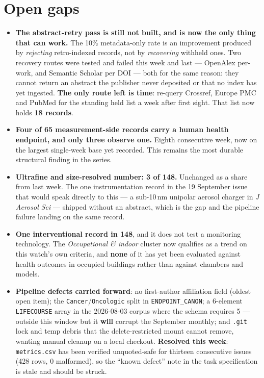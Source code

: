 \documentclass[10pt]{article}
\begin{document}
\vspace{2mm}
\section*{\sffamily\bfseries\color{Deep}Open gaps}
\vspace{-1.5mm}{\color{Teal}\rule{\linewidth}{1.1pt}}\vspace{2.5mm}

\footnotesize
\begin{itemize}
\item \textbf{The abstract-retry pass is still not built, and is now the only thing that
can work.} The 10\% metadata-only rate is an improvement produced by \emph{rejecting}
retro-indexed records, not by \emph{recovering} withheld ones. Two recovery routes were
tested and failed this week and last --- OpenAlex per-work, and Semantic Scholar per DOI
--- both for the same reason: they cannot return an abstract the publisher never deposited
or that no index has yet ingested. \textbf{The only route left is time}: re-query Crossref,
Europe PMC and PubMed for the standing held list a week after first sight. That list now
holds \textbf{18 records}.

\item \textbf{Four of 65 measurement-side records carry a human health endpoint, and only
three observe one.} Eighth consecutive week, now on the largest single-week base yet
recorded. This remains the most durable structural finding in the series.

\item \textbf{Ultrafine and size-resolved number: 3 of 148.} Unchanged as a share from
last week. The one instrumentation record in the 19 September issue that would speak
directly to this --- a sub-10\,nm unipolar aerosol charger in \textit{J Aerosol Sci} ---
shipped without an abstract, which is the gap and the pipeline failure landing on the
same record.

\item \textbf{One interventional record in 148}, and it does not test a monitoring
technology. The \textit{Occupational \& indoor} cluster now qualifies as a trend on this
watch's own criteria, and \textbf{none} of it has yet been evaluated against health
outcomes in occupied buildings rather than against chambers and models.

\item \textbf{Pipeline defects carried forward}: no first-author affiliation field (oldest
open item); the \texttt{Cancer}/\texttt{Oncologic} split in \texttt{ENDPOINT\_CANON}; a
6-element \texttt{LIFECOURSE} array in the 2026-08-03 corpus where the schema requires 5
--- outside this window but it \textbf{will} corrupt the September monthly; and
\texttt{.git} lock and temp debris that the delete-restricted mount cannot remove, wanting
manual cleanup on a local checkout. \textbf{Resolved this week}: \texttt{metrics.csv} has
been verified unquoted-safe for thirteen consecutive issues (428 rows, 0 malformed), so
the ``known defect'' note in the task specification is stale and should be struck.
\end{itemize}
\end{document}
